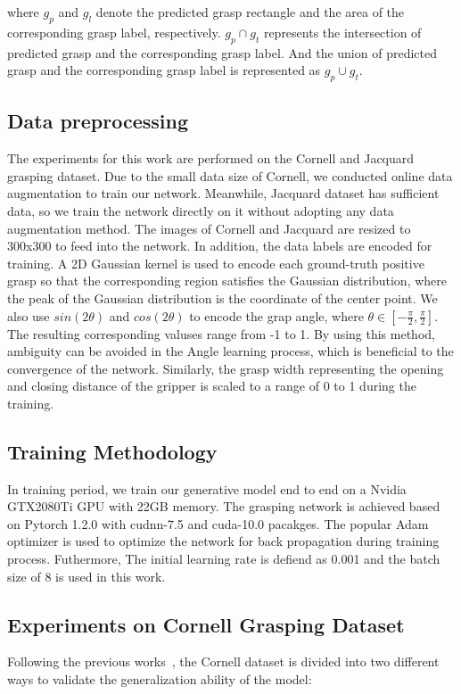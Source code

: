 \documentclass[journal]{IEEEtran}
\begin{document}
where $g_p$ and $g_l$ denote the predicted grasp rectangle and the area of the corresponding grasp label, respectively. $g_p \cap g_t$ represents the intersection of predicted grasp and the corresponding grasp label. And the union of predicted grasp and the corresponding grasp label is represented as $g_p \cup g_t$.
	
\subsection{Data preprocessing}
The experiments for this work are performed on the Cornell and Jacquard grasping dataset. Due to the small data size of Cornell, we conducted online data augmentation to train our network. Meanwhile, Jacquard dataset has sufficient data, so we train the network directly on it without adopting any data augmentation method. The images of Cornell and Jacquard are resized to 300x300 to feed into the network. In addition, the data labels are encoded for training. A 2D Gaussian kernel is used to encode each ground-truth positive grasp so that the corresponding region satisfies the Gaussian distribution, where the peak of the Gaussian distribution is the coordinate of the center point. We also use $sin(2\theta)$ and $cos(2\theta)$ to encode the grap angle, where $\theta \in [-\frac{\pi}{2}, \frac{\pi}{2}]$. The resulting corresponding valuses range from -1 to 1. By using this method, ambiguity can be avoided in the Angle learning process, which is beneficial to the convergence of the network. Similarly, the grasp width representing the opening and closing distance of the gripper is scaled to a range of 0 to 1 during the training.


\subsection{Training Methodology}

In training period, we train our generative model end to end on a Nvidia GTX2080Ti GPU with 22GB memory. The grasping network is achieved based on Pytorch 1.2.0 with cudnn-7.5 and cuda-10.0 pacakges.  The popular Adam optimizer is used to optimize the network for back propagation during training process. Futhermore, The initial learning rate is defiend as 0.001 and the batch size of 8 is used in this work.

\subsection{Experiments on Cornell Grasping Dataset}
Following the previous works~\cite{chu,zhou,song}, the Cornell dataset is divided into two different ways to validate the generalization ability of the model:
\end{document}
